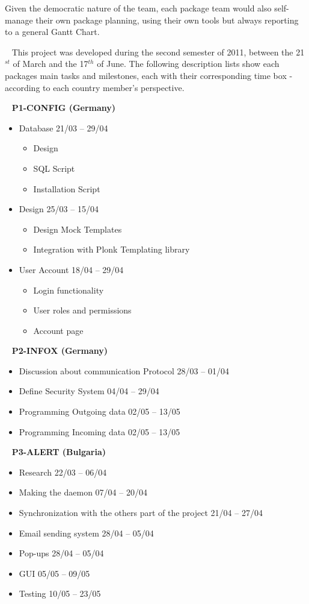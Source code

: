 Given the democratic nature of the team, each package team would also
self-manage their own package planning, using their own tools but always
reporting to a general Gantt Chart.

\ \newline
This project was developed during the second semester of 2011, between the
21$^{st}$ of March and the 17$^{th}$ of June. The following description lists
show each packages main tasks and milestones, each with their corresponding
time box - according to each country member's perspective.

\ \newline
\textbf{P1-CONFIG (Germany)} 
\begin{itemize}
\item Database \hfill 21/03 – 29/04 \begin{itemize}
  \item Design
  \item SQL Script
  \item Installation Script
\end{itemize}
\item Design \hfill 25/03 – 15/04 \begin{itemize}
  \item Design Mock Templates
  \item Integration with Plonk Templating library
\end{itemize}
\item User Account \hfill 18/04 – 29/04 \begin{itemize}
  \item Login functionality
  \item User roles and permissions
  \item Account page
\end{itemize}
\end{itemize}

\ \newline
\textbf{P2-INFOX (Germany)} 
\begin{itemize}
\item Discussion about communication Protocol \hfill 28/03 – 01/04
\item Define Security System \hfill 04/04 – 29/04
\item Programming Outgoing data	\hfill 02/05 – 13/05
\item Programming Incoming data	\hfill 02/05 – 13/05
\end{itemize}


\ \newline
\textbf{P3-ALERT (Bulgaria)} 
\begin{itemize}
\item Research	\hfill 22/03 – 06/04
\item Making the daemon	 \hfill 07/04 – 20/04
\item Synchronization with the others part of the project	\hfill 21/04 – 27/04
\item Email sending system	\hfill 28/04 – 05/04
\item Pop-ups	\hfill 28/04 – 05/04
\item GUI		\hfill 05/05 – 09/05
\item Testing	\hfill 10/05 – 23/05
\end{itemize}



